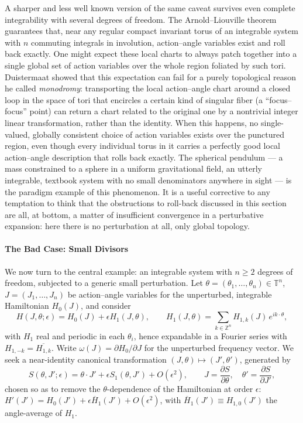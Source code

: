A sharper and less well known version of the same caveat survives even complete
integrability with several degrees of freedom. The Arnold--Liouville theorem
guarantees that, near any regular compact invariant torus of
an integrable system with $n$ commuting integrals in involution, action--angle
variables exist and roll back exactly. One might
expect these local charts to always patch together into a single global set of
action variables over the whole region foliated by such tori. Duistermaat
showed that this expectation can fail for a purely topological reason he called
\emph{monodromy}: transporting the local action--angle
chart around a closed loop in the space of tori that encircles a certain kind
of singular fiber (a ``focus--focus'' point) can return a chart related to the
original one by a nontrivial integer linear transformation, rather than the
identity. When this happens, no single-valued, globally consistent choice of
action variables exists over the punctured region, even though every individual
torus in it carries a perfectly good local action--angle description that rolls
back exactly. The spherical pendulum --- a mass constrained to a sphere in a
uniform gravitational field, an utterly integrable, textbook system with no
small denominators anywhere in sight --- is the paradigm example of this
phenomenon. It is a
useful corrective to any temptation to think that the obstructions to roll-back
discussed in this section are all, at bottom, a matter of insufficient convergence
in a perturbative expansion: here there is no perturbation at all, only global
topology.

\paragraph{The Bad Case: Small Divisors }

We now turn to the  central example: an integrable system with $n\ge2$
degrees of freedom, subjected to a generic small perturbation. Let
$\theta=(\theta_1,\dots,\theta_n)\in\mathbb T^n$, $J=(J_1,\dots,J_n)$ be
action--angle variables for the unperturbed, integrable Hamiltonian $H_0(J)$,
and consider
\begin{equation}
H(J,\theta;\epsilon)=H_0(J)+\epsilon H_1(J,\theta),
    \qquad H_1(J,\theta)=\sum_{k\in\mathbb Z^n}H_{1,k}(J)\,e^{ik\cdot\theta} ,
\label{pertH}
\end{equation}
with $H_1$ real and periodic in each $\theta_i$, hence expandable in a Fourier
series with $H_{1,-k}=\overline{H_{1,k}}$. Write $\omega(J)=\partial
H_0/\partial J$ for the unperturbed frequency vector. We seek a near-identity
canonical transformation $(J,\theta)\mapsto(J',\theta')$, generated by
\begin{equation}
S(\theta,J';\epsilon)=\theta\cdot J'+\epsilon S_1(\theta,J')+O(\epsilon^2),
    \qquad J=\frac{\partial S}{\partial\theta},
    \quad \theta'=\frac{\partial S}{\partial J'},
\label{genfn}
\end{equation}
chosen so as to remove the $\theta$-dependence of the Hamiltonian at order
$\epsilon$: $H'(J')=H_0(J')+\epsilon\overline{H}_1(J')+O(\epsilon^2)$, with
$\overline H_1(J')\equiv H_{1,0}(J')$ the angle-average of $H_1$.

